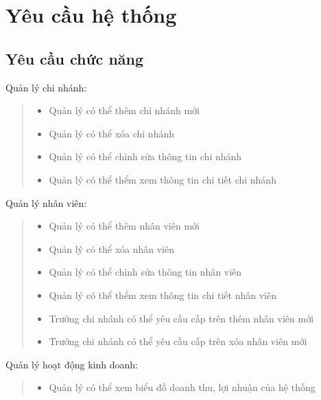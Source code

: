 \section{Yêu cầu hệ thống}
    \subsection{Yêu cầu chức năng}
        \hspace*{0.5cm}Quản lý chi nhánh:
        \begin{quote}
            \begin{itemize}
                \item Quản lý có thể thêm chi nhánh mới
                \item Quản lý có thể xóa chi nhánh
                \item Quản lý có thể chỉnh sửa thông tin chi nhánh
                \item Quản lý có thể thểm xem thông tin chi tiết chi nhánh
            \end{itemize}
        \end{quote}
        
        Quản lý nhân viên:
        \begin{quote}
            \begin{itemize}
                \item Quản lý có thể thêm nhân viên mới
                \item Quản lý có thể xóa nhân viên
                \item Quản lý có thể chỉnh sửa thông tin nhân viên
                \item Quản lý có thể thểm xem thông tin chi tiết nhân viên
                \item Trưởng chi nhánh có thể yêu cầu cấp trên thêm nhân viên mới
                \item Trưởng chi nhánh có thể yêu cầu cấp trên xóa nhân viên mới
            \end{itemize}
        \end{quote}
        
        Quản lý hoạt động kinh doanh:
        \begin{quote}
            \begin{itemize}
                \item Quản lý có thể xem biểu đồ doanh thu, lợi nhuận của hệ thống
            \end{itemize}
        \end{quote}
    
